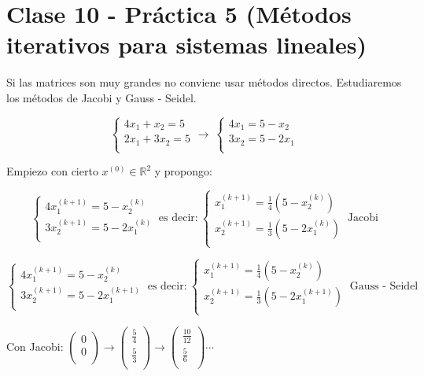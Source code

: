 \section{Clase 10 - Pr\'actica 5 (M\'etodos iterativos para sistemas lineales)}

Si las matrices son muy grandes no conviene usar m\'etodos directos. Estudiaremos los m\'etodos de Jacobi y Gauss - Seidel.

$$ 
	\begin{cases}
		4x_{1} + x_{2} = 5\\
		2x_{1} + 3x_{2} = 5\\
    \end{cases}
    \rightarrow \
    \begin{cases}
		4x_{1} = 5 - x_{2}\\
		3x_{2} = 5 - 2x_{1}\\
    \end{cases}
$$

Empiezo con cierto $x^{(0)} \in \mathbb{R}^{2}$ y propongo:

$$ 
    \begin{cases}
		4x_{1}^{(k + 1)} = 5 - x_{2}^{(k)}\\
		3x_{2}^{(k + 1)} = 5 - 2x_{1}^{(k)}\\
    \end{cases}
    \ \text{es decir:}\ 
    \begin{cases}
		x_{1}^{(k + 1)} = \frac{1}{4}(5 - x_{2}^{(k)})\\
		x_{2}^{(k + 1)} = \frac{1}{3}(5 - 2x_{1}^{(k)})\\
    \end{cases}
    \ \text{Jacobi}
$$

$$ 
    \begin{cases}
		4x_{1}^{(k + 1)} = 5 - x_{2}^{(k)}\\
		3x_{2}^{(k + 1)} = 5 - 2x_{1}^{(k + 1)}\\
    \end{cases}
    \ \text{es decir:}\ 
    \begin{cases}
		x_{1}^{(k + 1)} = \frac{1}{4}(5 - x_{2}^{(k)})\\
		x_{2}^{(k + 1)} = \frac{1}{3}(5 - 2x_{1}^{(k + 1)})\\
    \end{cases}
    \ \text{Gauss - Seidel}
$$

Con Jacobi: $
	\begin{pmatrix}
        0\\
        0\\
	\end{pmatrix}
	\rightarrow
	\begin{pmatrix}
        \frac{5}{4}\\
        \frac{5}{3}\\
	\end{pmatrix}
	\rightarrow
	\begin{pmatrix}
        \frac{10}{12}\\
        \frac{5}{6}\\
	\end{pmatrix}
	\cdots
$\\

